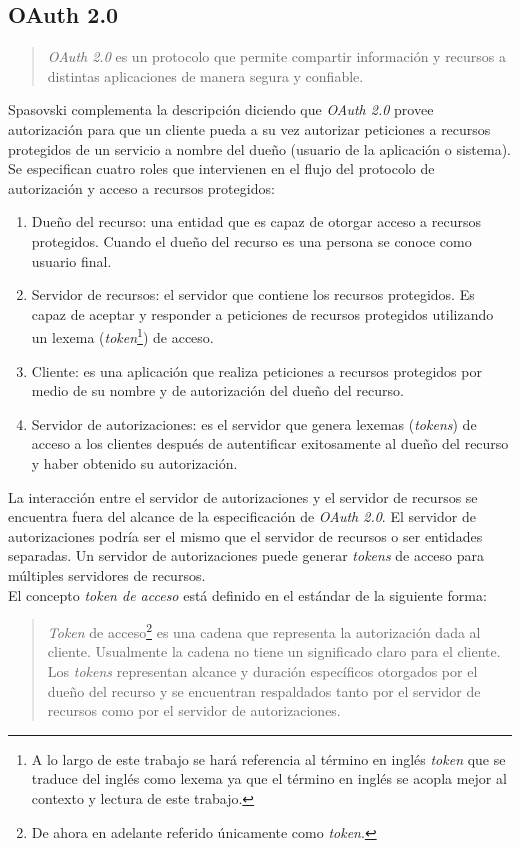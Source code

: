\subsection{OAuth 2.0}\label{sec:oauth}
\begin{quote}
	\textit{OAuth 2.0} es un protocolo que permite compartir información y recursos a distintas aplicaciones de manera segura y confiable\cite{MasteringOAuth2}.
\end{quote}
Spasovski complementa la descripción diciendo que \textit{OAuth 2.0} provee autorización para que un cliente pueda a su vez autorizar peticiones a recursos protegidos de un servicio a nombre del dueño (usuario de la aplicación o sistema)\cite{OAuth2Identity}.
Se especifican cuatro roles que intervienen en el flujo del protocolo de autorización y acceso a recursos protegidos\cite{OAuthRFC}:
\begin{enumerate}
	\item Dueño del recurso: una entidad que es capaz de otorgar acceso a recursos protegidos. Cuando el dueño del recurso es una persona se conoce como usuario final.
	\item Servidor de recursos: el servidor que contiene los recursos protegidos. Es capaz de aceptar y responder a peticiones de recursos protegidos utilizando un lexema (\textit{token}\footnote{A lo largo de este trabajo se hará referencia al término en inglés \textit{token} que se traduce del inglés como lexema ya que el término en inglés se acopla mejor al contexto y lectura de este trabajo.}) de acceso.
	\item Cliente: es una aplicación que realiza peticiones a recursos protegidos por medio de su nombre y de autorización del dueño del recurso.
	\item Servidor de autorizaciones: es el servidor que genera lexemas (\textit{tokens}) de acceso a los clientes después de autentificar exitosamente al dueño del recurso y haber obtenido su autorización.
\end{enumerate}
La interacción entre el servidor de autorizaciones y el servidor de recursos se encuentra fuera del alcance de la especificación de \textit{OAuth 2.0}. El servidor de autorizaciones podría ser el mismo que el servidor de recursos o ser entidades separadas. Un servidor de autorizaciones puede generar \textit{tokens} de acceso para múltiples servidores de recursos\cite{OAuthRFC}.\\
El concepto \textit{token de acceso} está definido en el estándar de la siguiente forma\cite{OAuthRFC}:
\begin{quote}
	\textit{Token} de acceso\footnote{De ahora en adelante referido únicamente como \textit{token}.} es una cadena que representa la autorización dada al cliente. Usualmente la cadena no tiene un significado claro para el cliente. Los \textit{tokens} representan alcance y duración específicos otorgados por el dueño del recurso y se encuentran respaldados tanto por el servidor de recursos como por el servidor de autorizaciones.
\end{quote}

